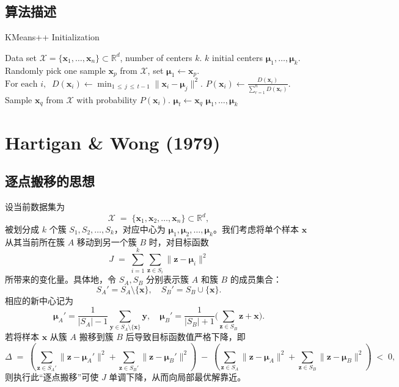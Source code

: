 \documentclass[12pt]{article}  %
\begin{document}
\subsection{算法描述}
\begin{algorithm}[H]
  \caption{KMeans++ Initialization}
  \begin{algorithmic}[1]
  \Require Data set $\mathcal{X} = \{\mathbf{x}_1, \ldots, \mathbf{x}_n\} \subset \mathbb{R}^d$, number of centers $k$.
  \Ensure $k$ initial centers $\boldsymbol{\mu}_1, \ldots, \boldsymbol{\mu}_k$.
  \vspace{6pt}
  \State Randomly pick one sample $\mathbf{x}_p$ from $\mathcal{X}$, set $\boldsymbol{\mu}_1 \gets \mathbf{x}_p$.
      \State \(\displaystyle \text{For each } i,\;\;D(\mathbf{x}_i) \gets 
      \min_{1 \,\le\, j \,\le\, t-1} \|\mathbf{x}_i - \boldsymbol{\mu}_j\|^2.\)
      \State \(\displaystyle P(\mathbf{x}_i) \gets 
      \frac{D(\mathbf{x}_i)}{\sum_{r=1}^n D(\mathbf{x}_r)}.\)
      \State Sample $\mathbf{x}_q$ from $\mathcal{X}$ with probability $P(\mathbf{x}_i)$.
      \State $\boldsymbol{\mu}_t \gets \mathbf{x}_q$
  \EndFor
  \State \Return $\boldsymbol{\mu}_1, \ldots, \boldsymbol{\mu}_k$
  \end{algorithmic}
  \end{algorithm}

\section{Hartigan \& Wong (1979)}
\subsection{逐点搬移的思想}
设当前数据集为
\[
  \mathcal{X} 
  \;=\; \{\mathbf{x}_1, \mathbf{x}_2, \ldots, \mathbf{x}_n\} \subset \mathbb{R}^d,
\]
被划分成 \(k\) 个簇 \(S_1, S_2, \ldots, S_k\)，对应中心为
\(\boldsymbol{\mu}_1, \boldsymbol{\mu}_2, \ldots, \boldsymbol{\mu}_k\)。我们考虑将单个样本 \(\mathbf{x}\) 从其当前所在簇 \(A\) 移动到另一个簇 \(B\) 时，对目标函数
\[
  J 
  \;=\;
  \sum_{i=1}^k 
  \sum_{\mathbf{z} \in S_i}
  \|\mathbf{z} - \boldsymbol{\mu}_i\|^2
\]
所带来的变化量。具体地，令 \(S_A, S_B\) 分别表示簇 \(A\) 和簇 \(B\) 的成员集合：
\[
  S_A' = S_A \setminus \{\mathbf{x}\}, 
  \quad
  S_B' = S_B \cup \{\mathbf{x}\}.
\]
相应的新中心记为
\[
  \boldsymbol{\mu}_A' 
  = 
  \frac{1}{|S_A|-1} \sum_{\mathbf{y} \in S_A \setminus \{\mathbf{x}\}} \mathbf{y},
  \quad
  \boldsymbol{\mu}_B' 
  = 
  \frac{1}{|S_B|+1} \biggl(\sum_{\mathbf{z}\in S_B}\mathbf{z} + \mathbf{x}\biggr).
\]
若将样本 \(\mathbf{x}\) 从簇 \(A\) 搬移到簇 \(B\) 后导致目标函数值严格下降，即
\[
  \Delta 
  \;=\;
  \left(\!\sum_{\mathbf{z}\in S_A'} \|\mathbf{z} - \boldsymbol{\mu}_A'\|^2 
  + 
  \sum_{\mathbf{z}\in S_B'} \|\mathbf{z} - \boldsymbol{\mu}_B'\|^2\right)
  \;-\;
  \left(\!\sum_{\mathbf{z}\in S_A} \|\mathbf{z} - \boldsymbol{\mu}_A\|^2 
  + 
  \sum_{\mathbf{z}\in S_B} \|\mathbf{z} - \boldsymbol{\mu}_B\|^2\right)
  \;<\; 0,
\]
则执行此“逐点搬移”可使 \(J\) 单调下降，从而向局部最优解靠近。
\end{document}
